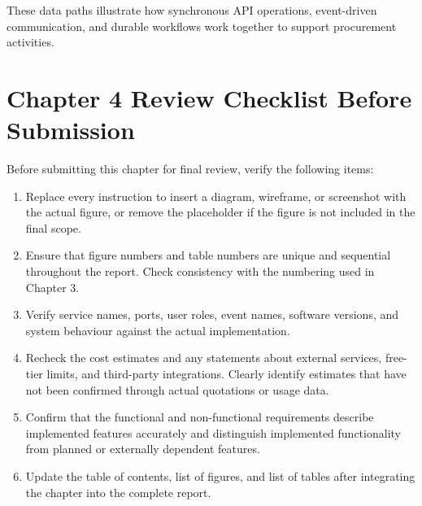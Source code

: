 \documentclass[12pt,a4paper]{report}
\begin{document}
These data paths illustrate how synchronous API operations,
event-driven communication, and durable workflows work together
to support procurement activities.

\section{Chapter 4 Review Checklist Before Submission}

Before submitting this chapter for final review, verify the following
items:

\begin{enumerate}[label=\arabic*.]
    \item Replace every instruction to insert a diagram, wireframe,
    or screenshot with the actual figure, or remove the placeholder
    if the figure is not included in the final scope.

    \item Ensure that figure numbers and table numbers are unique
    and sequential throughout the report. Check consistency with
    the numbering used in Chapter 3.

    \item Verify service names, ports, user roles, event names,
    software versions, and system behaviour against the actual
    implementation.

    \item Recheck the cost estimates and any statements about
    external services, free-tier limits, and third-party
    integrations. Clearly identify estimates that have not been
    confirmed through actual quotations or usage data.

    \item Confirm that the functional and non-functional
    requirements describe implemented features accurately and
    distinguish implemented functionality from planned or
    externally dependent features.

    \item Update the table of contents, list of figures, and
    list of tables after integrating the chapter into the
    complete report.
\end{enumerate}
\end{document}
